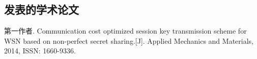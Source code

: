 \begin{resume}

  \section*{发表的学术论文} %

  \begin{enumerate}[{[}1{]}]
  \addtolength{\itemsep}{-.36\baselineskip}%
  \item 第一作者. Communication cost optimized session key transmission scheme for WSN based on non-perfect secret sharing.[J]. Applied Mechanics and Materials, 2014, ISSN: 1660-9336.
  \end{enumerate}

\end{resume}
